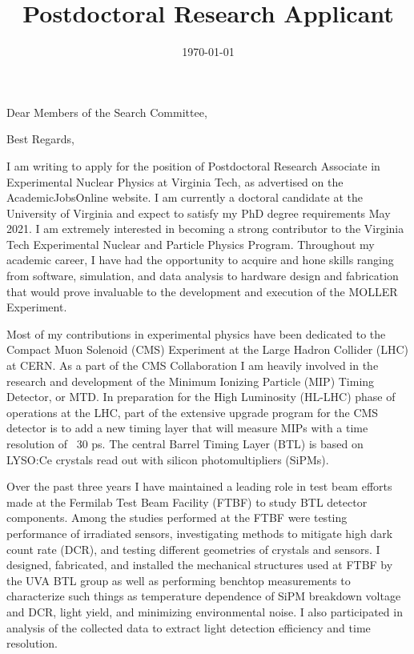 \documentclass[10pt,a4paper,sans,english]{moderncv}        %
\title{Postdoctoral Research Applicant}                               %
\begin{document}
\date{\today}
\opening{Dear Members of the Search Committee,}
\closing{Best Regards,}
\makelettertitle

I am writing to apply for the position of Postdoctoral Research Associate in Experimental Nuclear Physics at Virginia Tech, as advertised on the AcademicJobsOnline website.  I am currently a doctoral candidate at the University of Virginia and expect to satisfy my PhD degree requirements May 2021.  I am extremely interested in becoming a strong contributor to the Virginia Tech Experimental Nuclear and Particle Physics Program.  Throughout my academic career, I have had the opportunity to acquire and hone skills ranging from software, simulation, and data analysis to hardware design and fabrication that would prove invaluable to the development and execution of the MOLLER Experiment.

Most of my contributions in experimental physics have been dedicated to the Compact Muon Solenoid (CMS) Experiment at the Large Hadron Collider (LHC) at CERN.  As a part of the CMS Collaboration I am heavily involved in the research and development of the Minimum Ionizing Particle (MIP) Timing Detector, or MTD.  In preparation for the High Luminosity (HL-LHC) phase of operations at the LHC, part of the extensive upgrade program for the CMS detector is to add a new timing layer that will measure MIPs with a time resolution of ~30 ps.  The central Barrel Timing Layer (BTL) is based on LYSO:Ce crystals read out with silicon photomultipliers (SiPMs).  

Over the past three years I have maintained a leading role in test beam efforts made at the Fermilab Test Beam Facility (FTBF) to study BTL detector components.  Among the studies performed at the FTBF were testing performance of irradiated sensors, investigating methods to mitigate high dark count rate (DCR), and testing different geometries of crystals and sensors.  I designed, fabricated, and installed the mechanical structures used at FTBF by the UVA BTL group as well as performing benchtop measurements to characterize such things as temperature dependence of SiPM breakdown voltage and DCR, light yield, and minimizing environmental noise.  I also participated in analysis of the collected data to extract light detection efficiency and time resolution.
\end{document}
